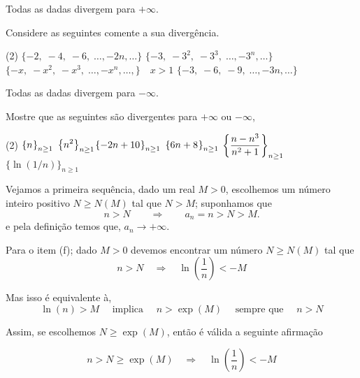 \solo Todas as \seqs dadas divergem para $+\infty$.

\begin{exer}
Considere as seguintes \seqs comente a sua diverg\^{e}ncia.
\begin{tasks}[label=\rm{(\alph*)},item-indent=4em,label-width=3ex,ref=(\alph*)](2)
 \task \(\{-2,\; -4,\; -6,\;\ldots,-2n,\ldots \}\)
 \task \(\{-3,\; -3^2,\; -3^3,\;\ldots,-3^n,\ldots\}\)
 \task \(\{-x,\; -x^2,\; -x^3,\;\ldots, -x^n,\ldots,\} \quad x>1 \)
 \task \(\{ -3,\; -6,\; -9,\;\ldots,-3n,\ldots \}\)
\end{tasks}
\end{exer}

\solo Todas as \seqs dadas divergem para $-\infty$.


\begin{exer}
Mostre que as seguintes \seqs s\~{a}o divergentes para $+\infty$ ou $-\infty$,
\begin{tasks}[label=\rm{(\alph*)},item-indent=6em,label-width=3ex,ref=(\alph*)](2)
\task  \(\displaystyle{\left\{n_{}\right\}_{n\geq 1}}\)
\task   \(\displaystyle{\left\{n^2_{}\right\}_{n\geq 1}}
\)\task \(\displaystyle{\left\{-2n+10_{}\right\}_{n\geq 1}}\)
\task   \(\displaystyle{\left\{6n+8_{}\right\}_{n\geq 1}}\)
\task \(\displaystyle{\left\{\dfrac{n-n^3}{n^2+1}_{}\right\}_{n\geq 1}}\)
\task \(\{\ln(1/n)\}_{n\geq 1}\)
\end{tasks}
\end{exer}

\solo Vejamos a primeira sequ\^{e}ncia, dado um real $M>0$, escolhemos um
n\'{u}mero inteiro positivo $N\geq N(M)$  tal que $N>M$; suponhamos que
\begin{equation*}
    n>N \qquad \Rightarrow\qquad a_n=n>N>M.
\end{equation*}
e pela defini\c{c}\~{a}o temos que, $a_n\to +\infty$.

Para o item (f); dado $M>0$ devemos encontrar um n\'{u}mero $N\geq N(M)$ tal que
\begin{equation*}
    n>N\quad \Rightarrow\quad  \ln\left(\frac{1}{n}\right)<-M
\end{equation*}

Mas isso \'{e} equivalente \`{a},
\begin{equation*}
    \ln(n)>M\quad \text{ implica }\quad n>\exp(M)\quad \text{ sempre que }\quad n>N
\end{equation*}

Assim, se escolhemos $N \geq \exp(M)$, ent\~{a}o \'{e} v\'{a}lida a seguinte afirma\c{c}\~{a}o

\begin{equation*}
    n> N \geq \exp(M) \quad \Rightarrow\quad  \ln\left(\frac{1}{n}\right)<-M
\end{equation*}

